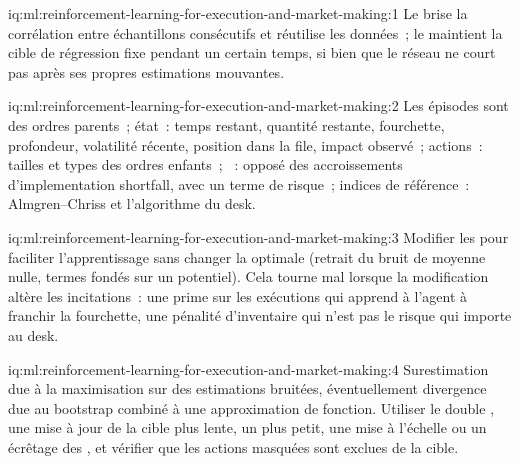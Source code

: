 \begin{solution}{iq:ml:reinforcement-learning-for-execution-and-market-making:1}
Le  brise la corrélation entre échantillons consécutifs et réutilise les données~; le  maintient la cible de régression fixe pendant
un certain temps, si bien que le réseau ne court pas après ses propres estimations mouvantes.
\end{solution}

\begin{solution}{iq:ml:reinforcement-learning-for-execution-and-market-making:2}
Les épisodes sont des ordres parents~; état~: temps restant, quantité restante, fourchette, profondeur, volatilité récente, position dans la file, impact observé~;
actions~: tailles et types des ordres enfants~; ~: opposé des accroissements d'implementation shortfall, avec un terme de risque~; indices de référence~:
Almgren--Chriss et l'algorithme du desk.
\end{solution}

\begin{solution}{iq:ml:reinforcement-learning-for-execution-and-market-making:3}
Modifier les  pour faciliter l'apprentissage sans changer la  optimale (retrait du bruit de moyenne nulle, termes fondés sur un potentiel). Cela tourne
mal lorsque la modification altère les incitations~: une prime sur les exécutions qui apprend à l'agent à franchir la fourchette, une pénalité d'inventaire qui
n'est pas le risque qui importe au desk.
\end{solution}

\begin{solution}{iq:ml:reinforcement-learning-for-execution-and-market-making:4}
Surestimation due à la maximisation sur des estimations bruitées, éventuellement divergence due au bootstrap combiné à une approximation de fonction.
Utiliser le double , une mise à jour de la cible plus lente, un  plus petit, une mise à l'échelle ou un écrêtage des , et vérifier que les actions masquées
sont exclues de la cible.
\end{solution}

